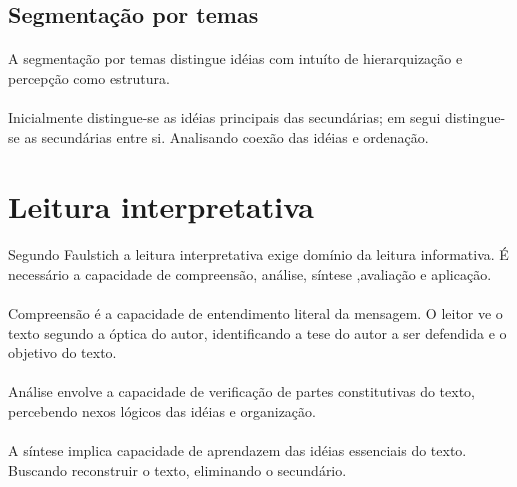 \subsection{Segmentação por temas}

\paragraph{}
A segmentação por temas distingue idéias com intuíto de hierarquização e percepção como estrutura.

\paragraph{}
Inicialmente distingue-se as idéias principais das secundárias; em segui distingue-se as secundárias entre si. Analisando coexão das idéias e ordenação.

\section{Leitura interpretativa}

\paragraph{}
Segundo Faulstich a leitura interpretativa exige domínio da leitura informativa. É necessário a capacidade de compreensão, análise, síntese ,avaliação e aplicação.

\paragraph{}
Compreensão é a capacidade de entendimento literal da mensagem. O leitor ve o texto segundo a óptica do autor, identificando a tese do autor a ser defendida e o objetivo do texto.

\paragraph{}
Análise envolve a capacidade de verificação de partes constitutivas do texto, percebendo nexos lógicos das idéias e organização. 

\paragraph{}
A síntese implica capacidade de aprendazem das idéias essenciais do texto. Buscando reconstruir o texto, eliminando o secundário.

